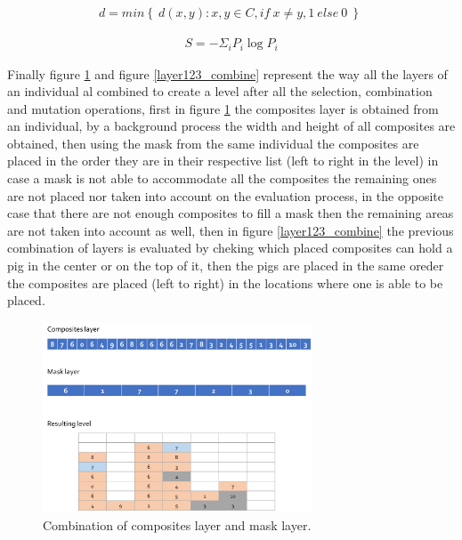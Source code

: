 \documentclass[conference]{IEEEtran}
\begin{document}
    \begin{equation}
        \begin{aligned}
        d = min \left\{ \ d(x,y): x,y \in C, if \: x \neq y, 1 \: else \: 0 \: \right\} \
        \end{aligned}
        \label{hamming_distance}
    \end{equation}
    
    \begin{equation}
        \begin{aligned}
        S = - \Sigma_i P_i \log P_i
        \end{aligned}
        \label{shannon_entropy}
    \end{equation}
    
    Finally figure \ref{layer12_combine} and figure \ref{layer123_combine} represent 
    the way all the layers of an individual al combined to create a level after all 
    the selection, combination and mutation operations, first in figure \ref{layer12_combine}
    the composites layer is obtained from an individual, by a background process the 
    width and height of all composites are obtained, then using the mask from the same 
    individual the composites are placed in the order they are in their respective list 
    (left to right in the level) in case a mask is not able to accommodate all the 
    composites the remaining ones are not placed nor taken into account on the evaluation 
    process, in the opposite case that there are not enough composites to fill a mask 
    then the remaining areas are not taken into account as well, then in figure \ref{layer123_combine} 
    the previous combination of layers is evaluated by cheking which placed composites 
    can hold a pig in the center or on the top of it, then the pigs are placed in the 
    same oreder the composites are placed (left to right) in the locations where one 
    is able to be placed.
    
    \begin{figure}[htbp]
        \centerline{\includegraphics[width=80mm]{Images/layer12_combine.png}}
        \caption{Combination of composites layer and mask layer.}
        \label{layer12_combine}
    \end{figure}
    
\end{document}
